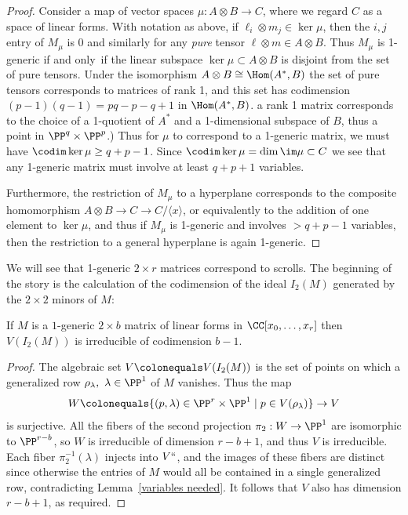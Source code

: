 \begin{proof} Consider a map of vector spaces $\mu : A\otimes B \to C$,
where we regard $C$ as a
space of linear forms.
With notation as above, if $\ell_i\otimes m_j\in \ker \mu$, then the $i,j$
entry of $M_\mu$ is 0 and similarly for
any \emph{pure} tensor $\ell\otimes m\in A\otimes B$. Thus $M_\mu$
is 1-generic if and only~if the linear subspace
$\ker \mu \subset  A\otimes B$
is disjoint from the set of pure tensors. Under the isomorphism $A\otimes
B \cong \Hom (A^*, B)$
the set of pure tensors corresponds to matrices of rank 1, and this set
has codimension $(p-1)(q-1) = pq-p-q+1$
in $\Hom(A^*, B)$. 
a rank 1 matrix corresponds to the choice of
a 1-quotient of $A^*$ and a 1-dimensional subspace
of $B$, thus a point in $\PP^q \times \PP^p$.)
Thus
for $\mu$ to correspond to a  1-generic matrix,  we must have $\codim
\ker \mu \geq q+p-1$. Since $\codim \ker \mu = \dim \im \mu\subset C$
we see that any 1-generic matrix must involve at least $q+p+1$ variables.

Furthermore, the restriction of $M_\mu$ to a hyperplane corresponds to
the composite homomorphism
$A\otimes B \to C \to C/\langle x \rangle$, or equivalently to the
addition of one element to $\ker \mu$, and thus
if $M_\mu$ is 1-generic and involves $>q+p-1$ variables, then the
restriction to a general hyperplane
is again 1-generic.
\end{proof}

We will see that 1-generic $2\times r$ matrices correspond to scrolls. The
beginning of the story is the
calculation of the codimension of the ideal $I_2(M)$ generated by the
$2\times 2$ minors of $M$:

\begin{lemma}\label{codim of 2,n 1-generic}
If $M$ is a $1$-generic $2\times b$ matrix of linear forms in
$\CC[x_0,\dots, x_r]$ then
$V(I_2(M))$ is irreducible of codimension $b-1$.
\unif
\end{lemma}

\begin{proof}
The algebraic set $V \colonequals   V(I_2(M))$ is the set of points
on which a generalized row $\rho_\lambda, \ \lambda\in \PP^1$ of $M$
vanishes. Thus the map
$$
W \colonequals  \{(p, \lambda) \in \PP^{r}\times \PP^{1}\mid p\in
V(\rho_{\lambda})\} \to V
$$
is surjective. All the fibers of the second projection $\pi_{2}: W\to
\PP^{1}$ are isomorphic to $\PP^{r-b}$, so $W$ is
irreducible of dimension $r-b+1$, and thus $V$ is irreducible. Each
fiber $\pi_{2}^{-1}(\lambda)$
injects into $V` `$, and the images of these fibers are distinct since
otherwise the entries of $M$ would all
be contained in a single generalized row, contradicting
Lemma~\ref{variables needed}. It follows
that $V$ also has dimension $r-b+1$, as required.
\end{proof}

